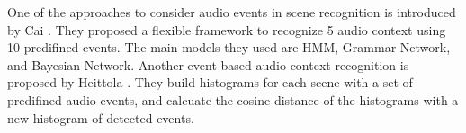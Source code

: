 One of the approaches to consider audio events in scene recognition is introduced by Cai \et \cite{cai2006flexible}. 
They proposed a flexible framework to recognize 5 audio context using 10 predifined events. 
The main models they used are HMM, Grammar Network, and Bayesian Network. 
Another event-based audio context recognition is proposed by Heittola \et \cite{heittola2010audio}. 
They build histograms for each scene with a set of predifined audio events, and calcuate the cosine distance of the histograms with a new histogram of detected events.\\

